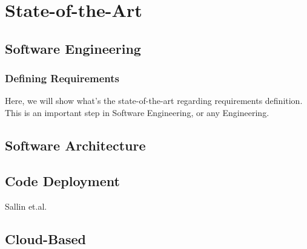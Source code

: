 \chapter{State-of-the-Art}
\label{state-of-the-art}

\section{Software Engineering}
\label{state-of-the-art:s:software-engineering}

\subsection{Defining Requirements}
\label{state-of-the-art:ss:defining-requirements}

Here, we will show what's the state-of-the-art regarding requirements definition. This is an important step in Software Engineering, or any Engineering.

\section{Software Architecture}
\label{state-of-the-art:s:software-architecture}

\section{Code Deployment}
\label{state-of-the-art:s:code-deployment}

Sallin et.al. \parencite{sallin_kropp_anslow_quilty_meier_2021}

\section{Cloud-Based}
\label{state-of-the-art:s:cloud-based}